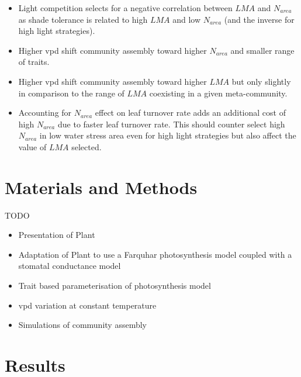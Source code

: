 \documentclass[a4paper,11pt]{article}
\begin{document}
\begin{itemize}

\item Light competition selects for a negative correlation between $LMA$ and $N_{area}$ as shade tolerance is related to high $LMA$ and low $N_{area}$ (and the inverse for high light strategies).

\item Higher vpd shift community assembly toward higher $N_{area}$ and smaller range of traits.

\item Higher vpd shift community assembly toward higher $LMA$ but only slightly in comparison to the range of $LMA$ coexisting in a given meta-community.

\item Accounting for $N_{area}$ effect on leaf turnover rate adds an
  additional cost of high $N_{area}$ due to faster leaf turnover
  rate. This should counter select high $N_{area}$ in low water stress
  area even for high light strategies but also affect the value of $LMA$ selected.

\end{itemize}


\section{Materials and Methods}

TODO

\begin{itemize}

\item Presentation of Plant

\item Adaptation of Plant to use a Farquhar photosynthesis model coupled with a stomatal conductance model

\item Trait based parameterisation of photosynthesis model

\item vpd variation at constant temperature
  
\item Simulations of community assembly 

\end{itemize}



\clearpage

\section{Results}
\end{document}
